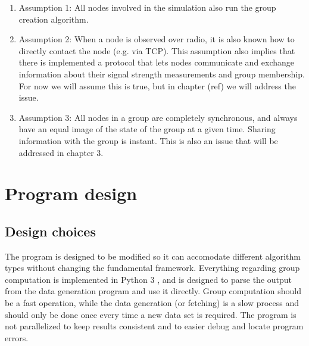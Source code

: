     \begin{enumerate}
    \item Assumption 1: All nodes involved in the simulation also run the group creation algorithm. 
		\item Assumption 2: When a node is observed over radio, it is also known how to directly contact the node (e.g. via TCP). This assumption also implies that there is implemented a protocol that lets nodes communicate and exchange information about their signal strength measurements and group membership. For now we will assume this is true, but in chapter {{(ref)}} we will address the issue. 
		\item Assumption 3: All nodes in a group are completely synchronous, and always have an equal image of the state of the group at a given time. Sharing information with the group is instant. This is also an issue that will be addressed in chapter {{3}}.
    \end{enumerate}
\section{Program design}
\subsection{Design choices}
The program is designed to be modified so it can accomodate different algorithm types without changing the fundamental framework.
Everything regarding group computation is implemented in Python 3 \cite{Python3}, and is designed to parse the output from the data generation program and use it directly.
Group computation should be a fast operation, while the data generation (or fetching) is a slow process and should only be done once every time a new data set is required.
The program is not parallelized to keep results consistent and to easier debug and locate program errors. 

